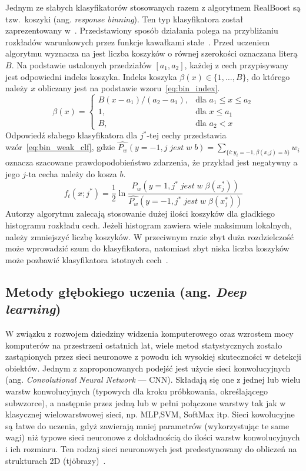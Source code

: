 Jednym ze słabych klasyfikatorów stosowanych razem z algorytmem RealBoost są tzw.\ koszyki (ang. \textit{response binning}).
Ten typ klasyfikatora został zaprezentowany w~\cite{1689652}.
Przedstawiony sposób działania polega na przybliżaniu rozkładów warunkowych przez funkcje kawałkami stałe~\cite{szybka_detekcja_klesk}.
Przed uczeniem algorytmu wyznacza na jest liczba koszyków o równej szerokości oznaczana literą $B$.
Na podstawie ustalonych przedziałów $[a_1,a_2]$, każdej z cech przypisywany jest odpowiedni indeks koszyka.
Indeks koszyka $\beta(x) \in \{1,\dots,B\}$, do którego należy $x$ obliczany jest na podstawie wzoru~\eqref{eq:bin_index}.
\begin{equation}
    \label{eq:bin_index}
    \beta(x)=\left.
    \begin{cases}
        B(x - a_1)/(a_2-a_1), & \text{dla } a_1 \leq x \leq a_2 \\
        1, & \text{dla } x \leq a_1 \\
        B, & \text{dla } a_2 < x
    \end{cases}
    \right.
\end{equation}
Odpowiedź słabego klasyfikatora dla $j^*$-tej cechy przedstawia wzór~\eqref{eq:bin_weak_clf}, gdzie $\hat{P_w}(y=-1, j\;jest\;w\;b)=\sum_{\{i:y_i=-1,\beta(x_ij)=b\}}^{} w_i$ oznacza szacowane prawdopodobieństwo zdarzenia, że przykład jest negatywny a jego $j$-ta cecha należy do kosza $b$.
\begin{equation}
    \label{eq:bin_weak_clf}
    f_t(x;j^*) = \dfrac{1}{2} \ln\dfrac{\hat{P_w}(y=1, j^*\;jest\;w\;\beta(x_j^*))}{\hat{P_w}(y=-1, j^*\;jest\;w\;\beta(x_j^*))}
\end{equation}
Autorzy algorytmu zalecają stosowanie dużej ilości koszyków dla gładkiego histogramu rozkładu cech.
Jeżeli histogram zawiera wiele maksimum lokalnych, należy zmniejszyć liczbę koszyków.
W przeciwnym razie zbyt duża rozdzielczość może wprowadzić szum do klasyfikatora, natomiast zbyt niska liczba koszyków może pozbawić klasyfikatora istotnych cech~\cite{1689652}.

\subsection{Metody głębokiego uczenia (ang. \textit{Deep learning})}
W związku z rozwojem dziedziny widzenia komputerowego oraz wzrostem mocy komputerów na przestrzeni ostatnich lat, wiele metod statystycznych zostało zastąpionych przez sieci neuronowe z powodu ich wysokiej skuteczności w detekcji obiektów.
Jednym z zaproponowanych podejść jest użycie sieci konwolucyjnych (ang. \textit{Convolutional Neural Network} --- CNN)\cite{cnn_detector}.
Składają się one z jednej lub wielu warstw konwolucyjnych (typowych dla kroku próbkowania, określającego subwzorce), a następnie przez jedną lub w pełni połączone warstwy tak jak w klasycznej wielowarstwowej sieci, np. MLP,SVM, SoftMax itp.
Sieci kowolucyjne są łatwe do uczenia, gdyż zawierają mniej parametrów (wykorzystując te same wagi) niż typowe sieci neuronowe z dokładnością do ilości warstw konwolucyjnych i ich rozmiaru.
Ten rodzaj sieci neuronowych jest predestynowany do obliczeń na strukturach 2D (tj\. obrazy)~\cite{cnn_agh}.

